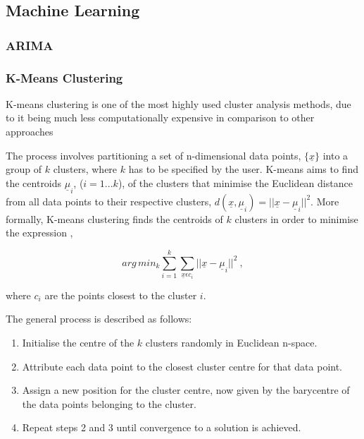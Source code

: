 \subsection{Machine Learning}
    \subsubsection{ARIMA}

\subsubsection{K-Means Clustering}
\label{subsec:kmeans}

K-means clustering is one of the most highly used cluster analysis methods, due to it being much less computationally expensive in comparison to other approaches \cite{Kanungo:2002:EKC:628329.628801}

The process involves partitioning a set of n-dimensional data points, $\{\underline{x}\}$ into a group of $k$ clusters, where $k$ has to be specified by the user. K-means aims to find the centroids $\underline{\mu}_i$, ($i=1...k$), of the clusters that minimise the Euclidean distance from all data points to their respective clusters, $d(\underline{x}, \underline{\mu}_i) = ||\underline{x}-\underline{\mu}_i||^2$. More formally, K-means clustering finds the centroids of $k$ clusters in order to minimise the expression \cite{596afe3f2b5a4ff3b8f4f9793ad2f4ee},

\begin{equation}
    arg\,min_k \sum_{i=1}^{k} \sum_{\underline{x} \epsilon c_i} ||\underline{x}-\underline{\mu}_i||^2 ~,
    \label{eq:K-means}
\end{equation}

where $c_i$ are the points closest to the cluster $i$.

The general process is described as follows:
\begin{enumerate}
    \item Initialise the centre of the $k$ clusters randomly in Euclidean n-space.
    \item Attribute each data point to the closest cluster centre for that data point. 
    \item Assign a new position for the cluster centre, now given by the barycentre of the data points belonging to the cluster.
    \item Repeat steps 2 and 3 until convergence to a solution is achieved.
\end{enumerate}

